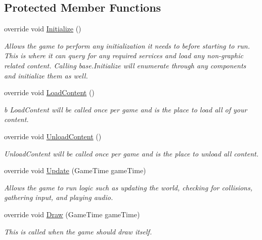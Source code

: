 \subsection*{Protected Member Functions}
\begin{DoxyCompactItemize}
\item 
override void \hyperlink{class_simple_r_p_g_1_1_game1_adb79c18a672c47805ed8e1ae2674b56a}{Initialize} ()
\begin{DoxyCompactList}\small\item\em Allows the game to perform any initialization it needs to before starting to run. This is where it can query for any required services and load any non-\/graphic related content. Calling base.\+Initialize will enumerate through any components and initialize them as well. \end{DoxyCompactList}\item 
override void \hyperlink{class_simple_r_p_g_1_1_game1_a2e98fc6671e04587ffec98ffcca94238}{Load\+Content} ()
\begin{DoxyCompactList}\small\item\em b Load\+Content will be called once per game and is the place to load all of your content. \end{DoxyCompactList}\item 
override void \hyperlink{class_simple_r_p_g_1_1_game1_a59ed8cc0b068541b3d6193ca2b11fe87}{Unload\+Content} ()
\begin{DoxyCompactList}\small\item\em Unload\+Content will be called once per game and is the place to unload all content. \end{DoxyCompactList}\item 
override void \hyperlink{class_simple_r_p_g_1_1_game1_a85efe43ca6a5e6404743a8dc97dc3698}{Update} (Game\+Time game\+Time)
\begin{DoxyCompactList}\small\item\em Allows the game to run logic such as updating the world, checking for collisions, gathering input, and playing audio. \end{DoxyCompactList}\item 
override void \hyperlink{class_simple_r_p_g_1_1_game1_a6fdaff73ada28185db615d2eeae9bdfc}{Draw} (Game\+Time game\+Time)
\begin{DoxyCompactList}\small\item\em This is called when the game should draw itself. \end{DoxyCompactList}\end{DoxyCompactItemize}



